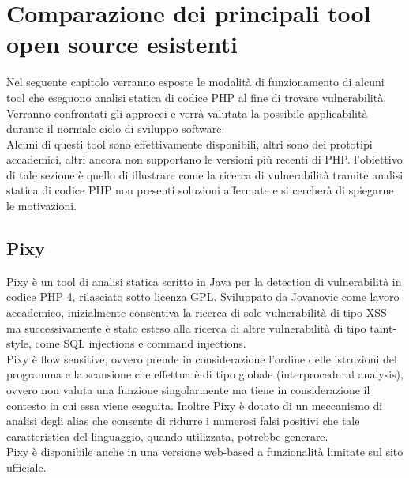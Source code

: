 \chapter{Comparazione dei principali tool open source esistenti}

\begin{epigraphs}
\end{epigraphs}

Nel seguente capitolo verranno esposte le modalità di funzionamento di alcuni tool che eseguono analisi statica di codice PHP al fine di trovare vulnerabilità. Verranno confrontati gli approcci e verrà valutata la possibile applicabilità durante il normale ciclo di sviluppo software. \\
Alcuni di questi tool sono effettivamente disponibili, altri sono dei prototipi accademici, altri ancora non supportano le versioni più recenti di PHP. l'obiettivo di tale sezione è quello di illustrare come la ricerca di vulnerabilità tramite analisi statica di codice PHP non presenti soluzioni affermate e si cercherà di spiegarne le motivazioni.

\section{Pixy}
Pixy è un tool di analisi statica scritto in Java per la detection di vulnerabilità in codice PHP 4, rilasciato sotto licenza GPL. Sviluppato da Jovanovic\cite{pixy} come lavoro accademico, inizialmente consentiva la ricerca di sole vulnerabilità di tipo XSS ma successivamente è stato esteso alla ricerca di altre vulnerabilità di tipo taint-style, come SQL injections e command injections.\\
Pixy è flow sensitive, ovvero prende in considerazione l'ordine delle istruzioni del programma e la scansione che effettua è di tipo globale (interprocedural analysis), ovvero non valuta una funzione singolarmente ma tiene in considerazione il contesto in cui essa viene eseguita. Inoltre Pixy è dotato di un meccanismo di analisi degli alias che consente di ridurre i numerosi falsi positivi che tale caratteristica del linguaggio, quando utilizzata, potrebbe generare.\\
Pixy è disponibile anche in una versione web-based a funzionalità limitate sul sito ufficiale\cite{pixyweb}.

